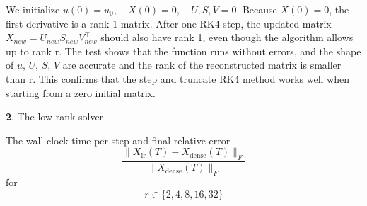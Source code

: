 \documentclass[11pt]{article}
\begin{document}
We initialize $u(0)=u_0, \quad X(0) =0, \quad U,S,V = 0$. Because $ X(0) =0$, the first derivative is a rank 1 matrix. After one RK4 step, the updated matrix $X_{new} = U_{new}S_{new}V_{new}^\top$ should also have rank 1, even though the algorithm allows up to rank r. The test shows that the function runs without errors, and the shape of $u$, $U$, $S$, $V$ are accurate and the rank of the reconstructed matrix is smaller than r. This confirms that the step and truncate RK4 method works well when starting from a zero initial matrix.

\vspace{1.5em}

\textbf{2}. The low-rank solver

The wall-clock time per step and final relative error
\[
\frac{\|X_{\text{lr}}(T) - X_{\text{dense}}(T)\|_F}{\|X_{\text{dense}}(T)\|_F}
\]
for
\[
r \in \{2,4,8,16,32\}
\]
\end{document}
